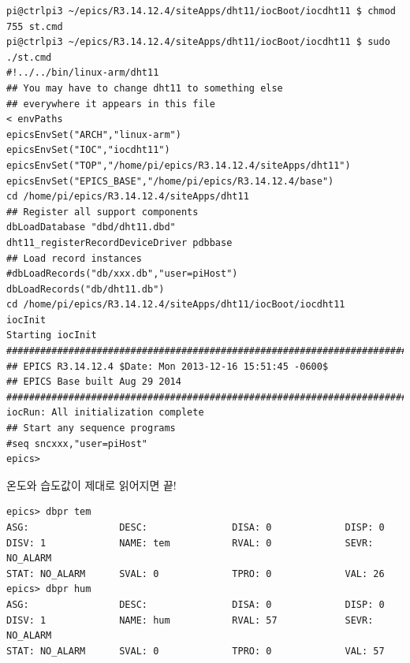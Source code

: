 \documentclass[11pt
  , a4paper
  , article
  , oneside
]{memoir}
\begin{document}
\begin{lstlisting}[style=termstyle]
pi@ctrlpi3 ~/epics/R3.14.12.4/siteApps/dht11/iocBoot/iocdht11 $ chmod 755 st.cmd
pi@ctrlpi3 ~/epics/R3.14.12.4/siteApps/dht11/iocBoot/iocdht11 $ sudo ./st.cmd
#!../../bin/linux-arm/dht11
## You may have to change dht11 to something else
## everywhere it appears in this file
< envPaths
epicsEnvSet("ARCH","linux-arm")
epicsEnvSet("IOC","iocdht11")
epicsEnvSet("TOP","/home/pi/epics/R3.14.12.4/siteApps/dht11")
epicsEnvSet("EPICS_BASE","/home/pi/epics/R3.14.12.4/base")
cd /home/pi/epics/R3.14.12.4/siteApps/dht11
## Register all support components
dbLoadDatabase "dbd/dht11.dbd"
dht11_registerRecordDeviceDriver pdbbase
## Load record instances
#dbLoadRecords("db/xxx.db","user=piHost")
dbLoadRecords("db/dht11.db")
cd /home/pi/epics/R3.14.12.4/siteApps/dht11/iocBoot/iocdht11
iocInit
Starting iocInit
############################################################################
## EPICS R3.14.12.4 $Date: Mon 2013-12-16 15:51:45 -0600$
## EPICS Base built Aug 29 2014
############################################################################
iocRun: All initialization complete
## Start any sequence programs
#seq sncxxx,"user=piHost"
epics> 
\end{lstlisting}
온도와 습도값이 제대로 읽어지면 끝!
\begin{lstlisting}[style=termstyle]
epics> dbpr tem
ASG:                DESC:               DISA: 0             DISP: 0             
DISV: 1             NAME: tem           RVAL: 0             SEVR: NO_ALARM      
STAT: NO_ALARM      SVAL: 0             TPRO: 0             VAL: 26     
epics> dbpr hum
ASG:                DESC:               DISA: 0             DISP: 0             
DISV: 1             NAME: hum           RVAL: 57            SEVR: NO_ALARM      
STAT: NO_ALARM      SVAL: 0             TPRO: 0             VAL: 57 
\end{lstlisting}
\end{document}
